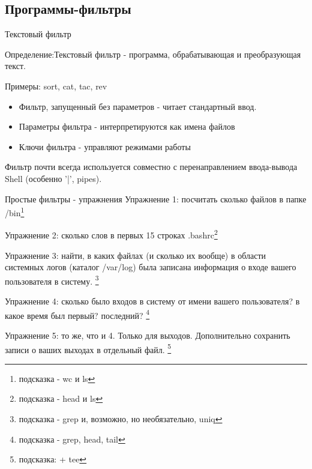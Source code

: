\subsection{Программы-фильтры}

\begin{frame}{Текстовый фильтр}

  Определение:\newline \alert{Текстовый фильтр} - программа, обрабатывающая и преобразующая текст. \newline

  Примеры: \alert{sort}, \alert{cat}, \alert{tac}, \alert{rev} \pause
  \begin{itemize}
    \item Фильтр, запущенный без параметров - читает стандартный ввод. 
    \item Параметры фильтра - интерпретируются как имена файлов
    \item Ключи фильтра - управляют режимами работы
  \end{itemize} \pause

  Фильтр почти всегда используется совместно с перенаправлением ввода-вывода Shell (особенно '|', pipes).

\end{frame}



\begin{frame}{Простые фильтры - упражнения}
  \alert{Упражнение 1}: посчитать сколько файлов в папке /bin\footnote{подсказка - \alert{wc} и \alert{ls}}

  \alert{Упражнение 2}: сколько слов в первых 15 строках .bashrc\footnote{подсказка - \alert{head} и \alert{ls}}

  \alert{Упражнение 3}: найти, в каких файлах (и сколько их вообще) в области системных логов (каталог \alert{/var/log}) была записана информация о входе вашего пользователя в систему. \footnote{подсказка - \alert{grep} и, возможно, но необязательно, \alert{uniq}}

  \alert{Упражнение 4}: сколько было входов в систему от имени вашего пользователя? в какое время был первый? последний? \footnote{подсказка - \alert{grep}, \alert{head}, \alert{tail}}

  \alert{Упражнение 5}: то же, что и 4. Только для выходов. Дополнительно сохранить записи о ваших выходах в отдельный файл. \footnote{подсказка: + \alert{tee}}

\end{frame}

